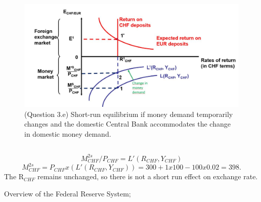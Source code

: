 \documentclass[	11pt, ]{fphw}
\begin{document}
\begin{figure}[h] 
\centering 
\includegraphics[scale=0.75]{31.JPG} 
\caption{(Question 3.e) Short-run equilibrium if money demand temporarily changes and the domestic Central Bank accommodates the change in domestic money demand.} 
\label{31}
\end{figure}

\subsection{}
\[ M_{CHF}^{2s}/P_{CHF} = L' ( R_{CHF}, Y_{CHF} ) \]
\[  M_{CHF}^{2s}=P_{CHF}x( L' ( R_{CHF}, Y_{CHF} ))= 300+1x100-100x0.02=398. \]
The R$_{CHF}$ remains unchanged, so there is not a short run effect on exchange rate.
\\
\begin{thebibliography}{99}
 Overview of the Federal Reserve System;
\end{thebibliography}
\end{document}
